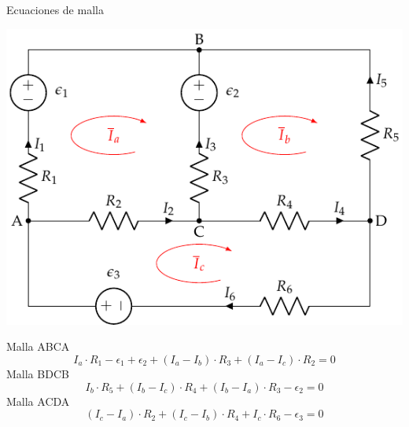 \documentclass[xcolor={usenames,svgnames,dvipsnames}]{beamer}
\begin{document}
\begin{frame}[label={sec:orgee57456}]{Ecuaciones de malla}
\begin{center}
\includegraphics[height=0.45\textheight]{figs/mallas1_corrientes.pdf}
\end{center}

Malla ABCA
\begin{equation*}
  I_a \cdot R_1 - \epsilon_1 + \epsilon_2 + (I_a - I_b) \cdot R_3 + (I_a - I_c) \cdot R_2 = 0
\end{equation*}
Malla BDCB
\begin{equation*}
  I_b \cdot R_5 + (I_b - I_c) \cdot R_4 + (I_b - I_a) \cdot R_3 - \epsilon_2 = 0
\end{equation*}
Malla ACDA
\begin{equation*}
  (I_c - I_a) \cdot R_2 + (I_c - I_b) \cdot R_4 + I_c \cdot R_6 - \epsilon_3 = 0
\end{equation*}
\end{frame}
\end{document}
